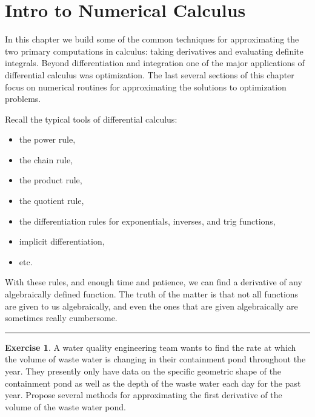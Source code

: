 \documentclass[
]{book}
\providecommand{\tightlist}{%
  \setlength{\itemsep}{0pt}\setlength{\parskip}{0pt}}
\theoremstyle{definition}
\theoremstyle{definition}
\theoremstyle{definition}
\newtheorem{exercise}{Exercise}[chapter]
\theoremstyle{remark}
\begin{document}
\hypertarget{intro-to-numerical-calculus}{%
\section{Intro to Numerical Calculus}\label{intro-to-numerical-calculus}}

In this chapter we build some of the common techniques for approximating
the two primary computations in calculus: taking derivatives and
evaluating definite integrals. Beyond differentiation and integration one of the major applications of differential calculus was optimization. The last several sections of this chapter focus on numerical routines for approximating the solutions to optimization problems.

Recall the typical tools of differential calculus:

\begin{itemize}
\tightlist
\item
  the power rule,
\item
  the chain rule,
\item
  the product rule,
\item
  the quotient rule,
\item
  the differentiation rules for exponentials, inverses, and trig
  functions,
\item
  implicit differentiation,
\item
  etc.
\end{itemize}

With these rules, and enough time and patience, we can find a derivative
of any algebraically defined function. The truth of the matter is that
not all functions are given to us algebraically, and even the ones that
are given algebraically are sometimes really cumbersome.

\begin{center}\rule{0.5\linewidth}{0.5pt}\end{center}

\begin{exercise}
\protect\hypertarget{exr:unnamed-chunk-132}{}{\label{exr:unnamed-chunk-132} }A water quality engineering team wants to find the rate at which the
volume of waste water is changing in their containment pond throughout
the year. They presently only have data on the specific geometric shape
of the containment pond as well as the depth of the waste water each day
for the past year. Propose several methods for approximating the first
derivative of the volume of the waste water pond.
\end{exercise}
\end{document}
